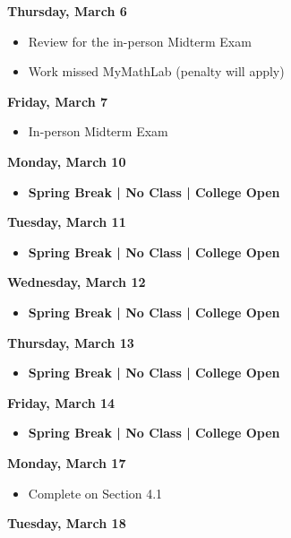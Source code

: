 \documentclass[11pt]{article}
\begin{document}
\textbf{Thursday, March 6}

\begin{itemize}
\item Review for the in-person Midterm Exam
\item Work missed MyMathLab (penalty will apply)
\end{itemize}

\textbf{Friday, March 7}

\begin{itemize}
\item In-person Midterm Exam
\end{itemize}

\textbf{Monday, March 10}

\begin{itemize}
\item \textbf{Spring Break | No Class | College Open}
\end{itemize}

\textbf{Tuesday, March 11}

\begin{itemize}
\item \textbf{Spring Break | No Class | College Open}
\end{itemize}

\textbf{Wednesday, March 12}

\begin{itemize}
\item \textbf{Spring Break | No Class | College Open}
\end{itemize}

\textbf{Thursday, March 13}

\begin{itemize}
\item \textbf{Spring Break | No Class | College Open}
\end{itemize}

\textbf{Friday, March 14}

\begin{itemize}
\item \textbf{Spring Break | No Class | College Open}
\end{itemize}

\textbf{Monday, March 17}

\begin{itemize}
\item Complete on Section 4.1
\end{itemize}

\textbf{Tuesday, March 18}
\end{document}
